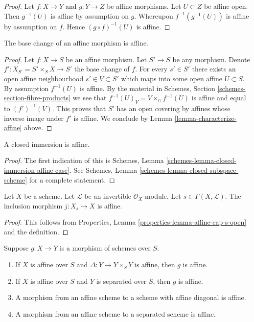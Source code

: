 \begin{proof}
Let $f : X \to Y$ and $g : Y \to Z$ be affine morphisms.
Let $U \subset Z$ be affine open. Then $g^{-1}(U)$ is affine
by assumption on $g$. Whereupon $f^{-1}(g^{-1}(U))$ is affine
by assumption on $f$. Hence $(g \circ f)^{-1}(U)$ is affine.
\end{proof}

\begin{lemma}
\label{lemma-base-change-affine}
The base change of an affine morphism is affine.
\end{lemma}

\begin{proof}
Let $f : X \to S$ be an affine morphism. Let $S' \to S$ be any morphism.
Denote $f' : X_{S'} = S' \times_S X \to S'$ the base change of $f$.
For every $s' \in S'$ there exists an open affine neighbourhood
$s' \in V \subset S'$ which maps into some open affine $U \subset S$.
By assumption $f^{-1}(U)$ is affine. By the material in
Schemes, Section \ref{schemes-section-fibre-products} we see
that $f^{-1}(U)_V = V \times_U f^{-1}(U)$ is affine and equal
to $(f')^{-1}(V)$. This proves that $S'$ has an open covering by
affines whose inverse image under $f'$ is affine. We conclude
by Lemma \ref{lemma-characterize-affine} above.
\end{proof}

\begin{lemma}
\label{lemma-closed-immersion-affine}
A closed immersion is affine.
\end{lemma}

\begin{proof}
The first indication of this is
Schemes, Lemma \ref{schemes-lemma-closed-immersion-affine-case}.
See Schemes, Lemma \ref{schemes-lemma-closed-subspace-scheme}
for a complete statement.
\end{proof}

\begin{lemma}
\label{lemma-affine-s-open}
Let $X$ be a scheme.
Let $\mathcal{L}$ be an invertible $\mathcal{O}_X$-module.
Let $s \in \Gamma(X, \mathcal{L})$.
The inclusion morphism $j : X_s \to X$ is affine.
\end{lemma}

\begin{proof}
This follows from Properties, Lemma \ref{properties-lemma-affine-cap-s-open}
and the definition.
\end{proof}

\begin{lemma}
\label{lemma-affine-permanence}
Suppose $g : X \to Y$ is a morphism of schemes over $S$.
\begin{enumerate}
\item If $X$ is affine over $S$ and $\Delta : Y \to Y \times_S Y$ is affine,
then $g$ is affine.
\item If $X$ is affine over $S$ and $Y$ is separated over $S$,
then $g$ is affine.
\item A morphism from an affine scheme to a scheme with affine
diagonal is affine.
\item A morphism from an affine scheme to a separated scheme is affine.
\end{enumerate}
\end{lemma}

